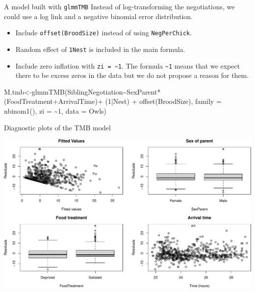\documentclass[
  ignorenonframetext,
]{beamer}
\newenvironment{Shaded}{\begin{snugshade}}{\end{snugshade}}
\newcommand{\AttributeTok}[1]{\textcolor[rgb]{0.77,0.63,0.00}{#1}}
\newcommand{\DecValTok}[1]{\textcolor[rgb]{0.00,0.00,0.81}{#1}}
\newcommand{\FunctionTok}[1]{\textcolor[rgb]{0.00,0.00,0.00}{#1}}
\newcommand{\NormalTok}[1]{#1}
\newcommand{\OtherTok}[1]{\textcolor[rgb]{0.56,0.35,0.01}{#1}}
\newcommand{\SpecialCharTok}[1]{\textcolor[rgb]{0.00,0.00,0.00}{#1}}
\providecommand{\tightlist}{%
  \setlength{\itemsep}{0pt}\setlength{\parskip}{0pt}}
\begin{document}
\begin{frame}[fragile]{A model built with \texttt{glmmTMB}}
\protect\hypertarget{a-model-built-with-glmmtmb}{}
Instead of log-transforming the negotiations, we could use a log link
and a negative binomial error distribution.

\begin{itemize}
\tightlist
\item
  Include \texttt{offset(BroodSize)} instead of using
  \texttt{NegPerChick}.
\item
  Random effect of \texttt{1\textbar{}Nest} is included in the main
  formula.
\item
  Include zero inflation with \texttt{zi\ =\ \textasciitilde{}1}. The
  formula \texttt{\textasciitilde{}1} means that we expect there to be
  excess zeros in the data but we do not propose a reason for them.
\end{itemize}

\scriptsize

\begin{Shaded}
\begin{Highlighting}[]
\NormalTok{M.tmb}\OtherTok{\textless{}{-}}\FunctionTok{glmmTMB}\NormalTok{(SiblingNegotiation}\SpecialCharTok{\textasciitilde{}}\NormalTok{SexParent}\SpecialCharTok{*}\NormalTok{(FoodTreatment}\SpecialCharTok{+}\NormalTok{ArrivalTime)}\SpecialCharTok{+} 
\NormalTok{                    (}\DecValTok{1}\SpecialCharTok{|}\NormalTok{Nest) }\SpecialCharTok{+} \FunctionTok{offset}\NormalTok{(BroodSize),}
                    \AttributeTok{family =} \FunctionTok{nbinom1}\NormalTok{(), }\AttributeTok{zi =} \SpecialCharTok{\textasciitilde{}}\DecValTok{1}\NormalTok{, }\AttributeTok{data =}\NormalTok{ Owls)}
\end{Highlighting}
\end{Shaded}
\end{frame}

\begin{frame}{Diagnostic plots of the TMB model}
\protect\hypertarget{diagnostic-plots-of-the-tmb-model}{}
\scriptsize

\includegraphics{mixed_models_files/figure-beamer/unnamed-chunk-24-1.pdf}
\end{frame}
\end{document}
